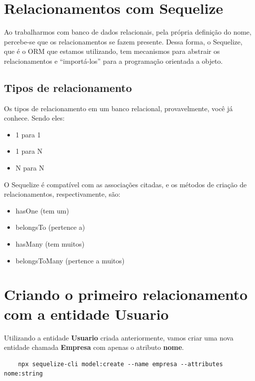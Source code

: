 \section{Relacionamentos com Sequelize}

Ao trabalharmos com banco de dados relacionais, pela própria definição do nome, percebe-se que os relacionamentos se fazem presente. Dessa forma, o Sequelize, que é o ORM que estamos utilizando, tem mecanismos para abstrair os relacionamentos e ``importá-los'' para a programação orientada a objeto. 

\subsection{Tipos de relacionamento}

Os tipos de relacionamento em um banco relacional, provavelmente, você já conhece. Sendo eles: 

\begin{itemize}
	\item 1 para 1
	\item 1 para N
	\item N para N
\end{itemize}

O Sequelize é compatível com as associações citadas, e os métodos de criação de relacionamentos, respectivamente, são:

\begin{itemize}
	\item hasOne (tem um)
	\item belongsTo (pertence a)
	\item hasMany (tem muitos)
	\item belongsToMany (pertence a muitos)
\end{itemize}

\section{Criando o primeiro relacionamento com a entidade \textbf{Usuario}}

Utilizando a entidade \textbf{Usuario} criada anteriormente, vamos criar uma nova entidade chamada \textbf{Empresa} com apenas o atributo \textbf{nome}. 

\begin{verbatim}
	npx sequelize-cli model:create --name empresa --attributes nome:string
\end{verbatim}

